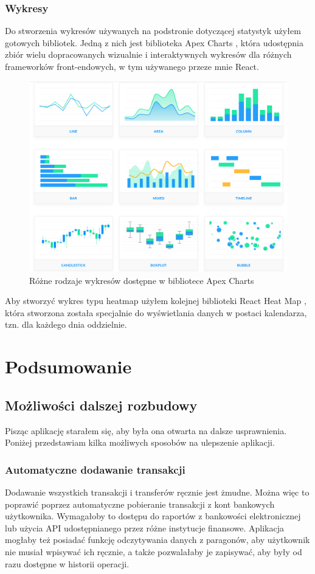 \documentclass[shortabstract,inz]{iithesis}
\begin{document}
\subsection{Wykresy}
Do stworzenia wykresów używanych na podstronie dotyczącej statystyk użyłem gotowych bibliotek. Jedną z nich jest biblioteka Apex Charts \citep{apex-charts}, która udostępnia zbiór wielu dopracowanych wizualnie i interaktywnych wykresów dla różnych frameworków front-endowych, w tym używanego przeze mnie React. 
\begin{figure}
	\centering
	\includegraphics[scale=0.5]{screen-apex-demos.png}
	\caption{Różne rodzaje wykresów dostępne w bibliotece Apex Charts}
	\label{fig:apex-demos}
\end{figure}

Aby stworzyć wykres typu heatmap użyłem kolejnej biblioteki React Heat Map \citep{heatmap}, która stworzona została specjalnie do wyświetlania danych w postaci kalendarza, tzn. dla każdego dnia oddzielnie. 

\chapter{Podsumowanie}
\section{Możliwości dalszej rozbudowy}
Pisząc aplikację starałem się, aby była ona otwarta na dalsze usprawnienia. Poniżej przedstawiam kilka możliwych sposobów na ulepszenie aplikacji.
\subsection{Automatyczne dodawanie transakcji}
Dodawanie wszystkich transakcji i transferów ręcznie jest żmudne. Można więc to poprawić poprzez automatyczne pobieranie transakcji z kont bankowych użytkownika. Wymagałoby to dostępu do raportów z bankowości elektronicznej lub użycia API udostępnianego przez różne instytucje finansowe. Aplikacja mogłaby też posiadać funkcję odczytywania danych z paragonów, aby użytkownik nie musiał wpisywać ich ręcznie, a także pozwalałaby je zapisywać, aby były od razu dostępne w historii operacji.
\end{document}
